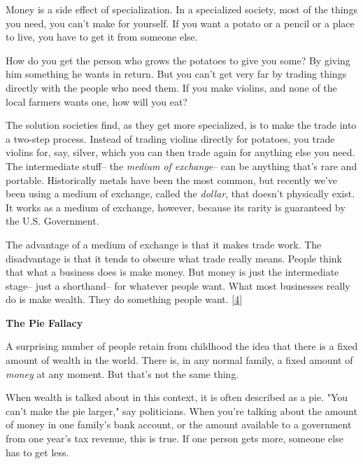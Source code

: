 Money
                    is a side effect of specialization. In a specialized
                    society, most of the things you need, you can't make for
                    yourself. If you want a potato or a pencil or a place to
                    live, you have to get it from someone else.

How
                    do you get the person who grows the potatoes to give you
                    some? By giving him something he wants in return. But you
                    can't get very far by trading things directly with the
                    people who need them. If you make violins, and none of the
                    local farmers wants one, how will you eat?

The
                    solution societies find, as they get more specialized, is to
                    make the trade into a two-step process. Instead of trading
                    violins directly for potatoes, you trade violins for, say,
                    silver, which you can then trade again for anything else you
                    need. The intermediate stuff-- the
                    \emph{medium of exchange}-- can be anything that's rare and
                    portable. Historically metals have been the most common, but
                    recently we've been using a medium of exchange, called the
                    \emph{dollar}, that doesn't physically exist. It works as a
                    medium of exchange, however, because its rarity is
                    guaranteed by the U.S. Government.

The advantage
                    of a medium of exchange is that it makes trade work. The
                    disadvantage is that it tends to obscure what trade really
                    means. People think that what a business does is make money.
                    But money is just the intermediate stage-- just a
                    shorthand-- for whatever people want. What most businesses
                    really do is make wealth. They do something people want.
                    [\href{\#f4n}{4}]

\textbf{The Pie Fallacy}

A surprising
                    number of people retain from childhood the idea that there
                    is a fixed amount of wealth in the world. There is, in any
                    normal family, a fixed amount of \emph{money} at any moment.
                    But that's not the same thing.

When wealth is
                    talked about in this context, it is often described as a
                    pie. "You can't make the pie larger," say politicians. When
                    you're talking about the amount of money in one family's
                    bank account, or the amount available to a government from
                    one year's tax revenue, this is true. If one person gets
                    more, someone else has to get less.

